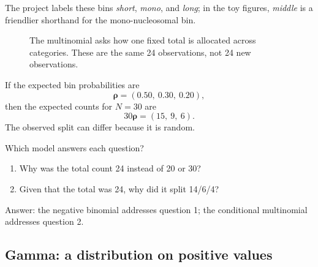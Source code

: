 \documentclass[11pt]{article}
\begin{document}
The project labels these bins \emph{short}, \emph{mono}, and \emph{long}; in the
toy figures, \emph{middle} is a friendlier shorthand for the mono-nucleosomal bin.

\begin{figure}[H]
\centering
{}
\caption{The multinomial asks how one fixed total is allocated across categories. These are the same 24 observations, not 24 new observations.}
\end{figure}

If the expected bin probabilities are
\[
\boldsymbol{\rho}=(0.50,\ 0.30,\ 0.20),
\]
then the expected counts for \(N=30\) are
\[
30\boldsymbol{\rho}=(15,\ 9,\ 6).
\]
The observed split can differ because it is random.

\begin{checkpoint}
Which model answers each question?

\begin{enumerate}[leftmargin=2em]
  \item Why was the total count 24 instead of 20 or 30?
  \item Given that the total was 24, why did it split 14/6/4?
\end{enumerate}

Answer: the negative binomial addresses question 1; the conditional multinomial
addresses question 2.
\end{checkpoint}

\subsection{Gamma: a distribution on positive values}
\end{document}

